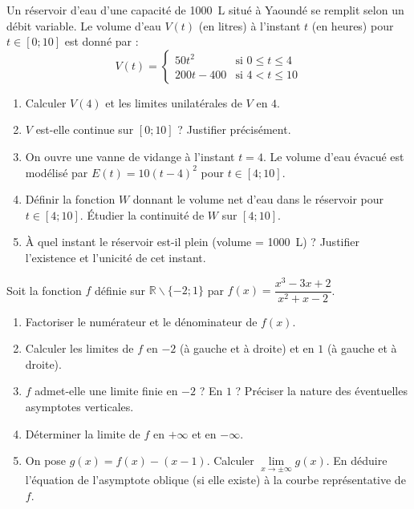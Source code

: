 \documentclass[11pt]{article}
\def\setminus{\mathbin{\backslash}}\let\smallsetminus\setminus
\begin{document}
\begin{exercice}
Un réservoir d'eau d'une capacité de \SI{1000}{L} situé à Yaoundé se remplit selon un débit variable. Le volume d'eau $V(t)$ (en litres) à l'instant $t$ (en heures) pour $t \in [0 ; 10]$ est donné par :
\[
V(t) = \begin{cases}
50t^2 & \text{si } 0 \leq t \leq 4 \\
200t - 400 & \text{si } 4 < t \leq 10
\end{cases}
\]
\begin{enumerate}
    \item Calculer $V(4)$ et les limites unilatérales de $V$ en $4$.
    \item $V$ est-elle continue sur $[0 ; 10]$ ? Justifier précisément.
    \item On ouvre une vanne de vidange à l'instant $t=4$. Le volume d'eau évacué est modélisé par $E(t) = 10(t-4)^2$ pour $t \in [4 ; 10]$. 
    \item Définir la fonction $W$ donnant le volume net d'eau dans le réservoir pour $t \in [4 ; 10]$. Étudier la continuité de $W$ sur $[4 ; 10]$.
    \item À quel instant le réservoir est-il plein (volume = \SI{1000}{L}) ? Justifier l'existence et l'unicité de cet instant.
\end{enumerate}
\end{exercice}

\begin{exercice}
Soit la fonction $f$ définie sur $\mathbb{R} \setminus \{-2 ; 1\}$ par $f(x) = \dfrac{x^3 - 3x + 2}{x^2 + x - 2}$.
\begin{enumerate}
    \item Factoriser le numérateur et le dénominateur de $f(x)$.
    \item Calculer les limites de $f$ en $-2$ (à gauche et à droite) et en $1$ (à gauche et à droite).
    \item $f$ admet-elle une limite finie en $-2$ ? En $1$ ? Préciser la nature des éventuelles asymptotes verticales.
    \item Déterminer la limite de $f$ en $+\infty$ et en $-\infty$. 
    \item On pose $g(x) = f(x) - (x - 1)$. Calculer $\lim\limits_{x \to \pm\infty} g(x)$. En déduire l'équation de l'asymptote oblique (si elle existe) à la courbe représentative de $f$.
\end{enumerate}
\end{exercice}
\end{document}
